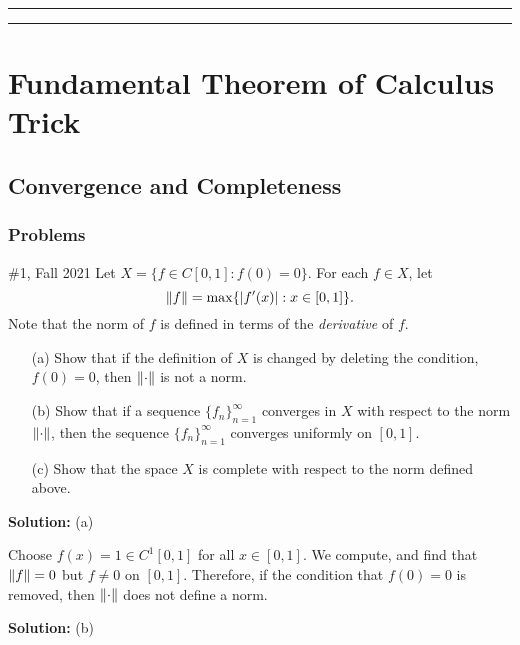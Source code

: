 \documentclass{article}
\begin{document}
\hrule\vspace{2pt}
\hrule


\break

\section{Fundamental Theorem of Calculus Trick}

\subsection{Convergence and Completeness}

\subsubsection{Problems}

\begin{problem}{\#1, Fall 2021} Let $X = \{f \in C[0,1] : f(0) = 0\}$. For each $f\in X$, let 
	\[\left\lVert { f } \right\rVert = \max\{ |f'(x)| : x\in [0,1]\}.\]
Note that the norm of $f$ is defined in terms of the \textit{derivative} of $f$. 
\begin{enumerate}
	\item[(a)] Show that if the definition of $X$ is changed by deleting the condition, $f(0) = 0$, 
		then $\left\lVert {\cdot} \right\rVert$ is not a norm. 
	\item[(b)] Show that if a sequence $\{f_n\}_{n=1}^\infty$ converges in $X$ with respect to the norm $\left\lVert {\cdot} \right\rVert$,
		then the sequence $\{f_n\}_{n=1}^\infty$ converges uniformly on $[0,1]$.
	\item[(c)] Show that the space $X$ is complete with respect to the norm defined above.
\end{enumerate}

\end{problem}

\textbf{Solution:} (a) 

Choose $f(x) = 1\in C^1[0,1]$ for all $x\in [0,1]$. We compute, and find that $\left\lVert {f} \right\rVert = 0$ but $f\neq0$ on $[0,1]$.
Therefore, if the condition that $f(0) = 0$ is removed, then $\left\lVert {\cdot} \right\rVert$ does not define a norm.

\textbf{Solution:} (b) 
\end{document}
